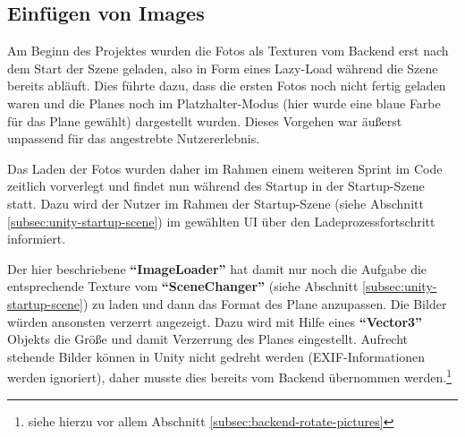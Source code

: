 \subsection{Einfügen von Images}
\label{subsec:unity-image-loader}

Am Beginn des Projektes wurden die Fotos als Texturen vom Backend erst nach dem Start der Szene geladen, also in Form eines Lazy-Load während die Szene bereits abläuft. Dies führte dazu, dass die ersten Fotos noch nicht fertig geladen waren und die Planes noch im Platzhalter-Modus (hier wurde eine blaue Farbe für das Plane gewählt) dargestellt wurden. Dieses Vorgehen war äußerst unpassend für das angestrebte Nutzererlebnis. 

Das Laden der Fotos wurden daher im Rahmen einem weiteren Sprint im Code zeitlich vorverlegt und findet nun während des Startup in der Startup-Szene statt. Dazu wird der Nutzer im Rahmen der Startup-Szene (siehe Abschnitt \ref{subsec:unity-startup-scene}) im gewählten UI über den Ladeprozessfortschritt informiert.

Der hier beschriebene \textbf{``ImageLoader''} hat damit nur noch die Aufgabe die entsprechende Texture vom \textbf{``SceneChanger''} (siehe Abschnitt \ref{subsec:unity-startup-scene}) zu laden und dann das Format des Plane anzupassen. Die Bilder würden ansonsten verzerrt angezeigt. Dazu wird mit Hilfe eines \textbf{``Vector3''} Objekts die Größe und damit Verzerrung des Planes eingestellt. Aufrecht stehende Bilder können in Unity nicht gedreht werden (EXIF-Informationen werden ignoriert), daher musste dies bereits vom Backend übernommen werden.\footnote{siehe hierzu vor allem Abschnitt \ref{subsec:backend-rotate-pictures}} 


